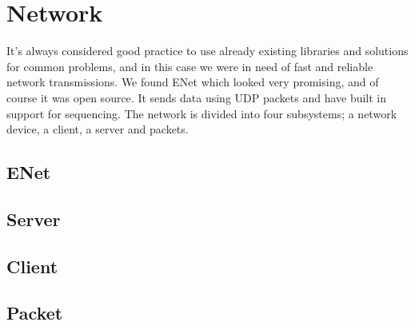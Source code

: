 \section{Network}
It's always considered good practice to use already existing libraries and solutions for common problems, and in this case we were in need of fast and reliable network transmissions.
We found ENet which looked very promising, and of course it was open source. It sends data using UDP packets and have built in support for sequencing.
The network is divided into four subsystems; a network device, a client, a server and packets.
\subsection{ENet}
\subsection{Server}
\subsection{Client}
\subsection{Packet}

